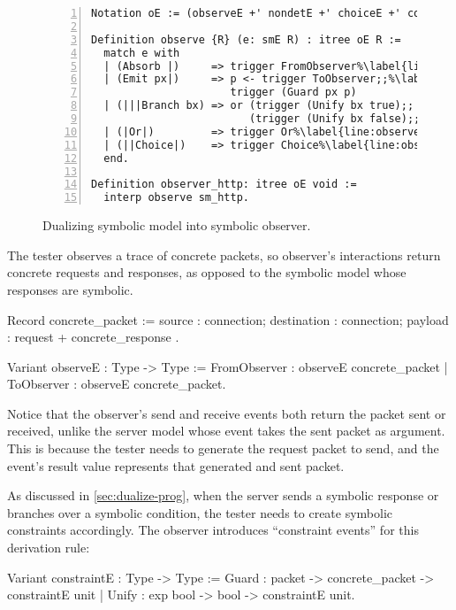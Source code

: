 \begin{figure}
\begin{lstlisting}[style=customcoq,numbers=left,escapechar=\%]
Notation oE := (observeE +' nondetE +' choiceE +' constraintE).

Definition observe {R} (e: smE R) : itree oE R :=
  match e with
  | (Absorb |)     => trigger FromObserver%\label{line:observe-absorb}%
  | (Emit px|)     => p <- trigger ToObserver;;%\label{line:observe-emit}%
                      trigger (Guard px p)
  | (|||Branch bx) => or (trigger (Unify bx true);;  ret true)%\label{line:observe-branch}%
                         (trigger (Unify bx false);; ret false)
  | (|Or|)         => trigger Or%\label{line:observe-or}%
  | (||Choice|)    => trigger Choice%\label{line:observe-choice}%
  end.

Definition observer_http: itree oE void :=
  interp observe sm_http.
\end{lstlisting}
\caption{Dualizing symbolic model into symbolic observer.}
\label{fig:symbolic-observer}
\end{figure}

The tester observes a trace of concrete packets, so observer's interactions
return concrete requests and responses, as opposed to the symbolic model whose
responses are symbolic.
\begin{coq}
  Record concrete_packet := {
    source      : connection;
    destination : connection;
    payload     : request + concrete_response
  }.

  Variant observeE : Type -> Type :=
    FromObserver   : observeE concrete_packet
  | ToObserver     : observeE concrete_packet.
\end{coq}

Notice that the observer's send and receive events both return the packet sent
or received, unlike the server model whose  event takes the sent
packet as argument.  This is because the tester needs to generate the request
packet to send, and the event's result value represents that generated and sent
packet.

As discussed in \autoref{sec:dualize-prog}, when the server sends a symbolic
response or branches over a symbolic condition, the tester needs to create
symbolic constraints accordingly.  The observer introduces ``constraint events''
for this derivation rule:
\begin{coq}
  Variant constraintE : Type -> Type :=
    Guard : packet -> concrete_packet -> constraintE unit
  | Unify : exp bool -> bool -> constraintE unit.
\end{coq}

